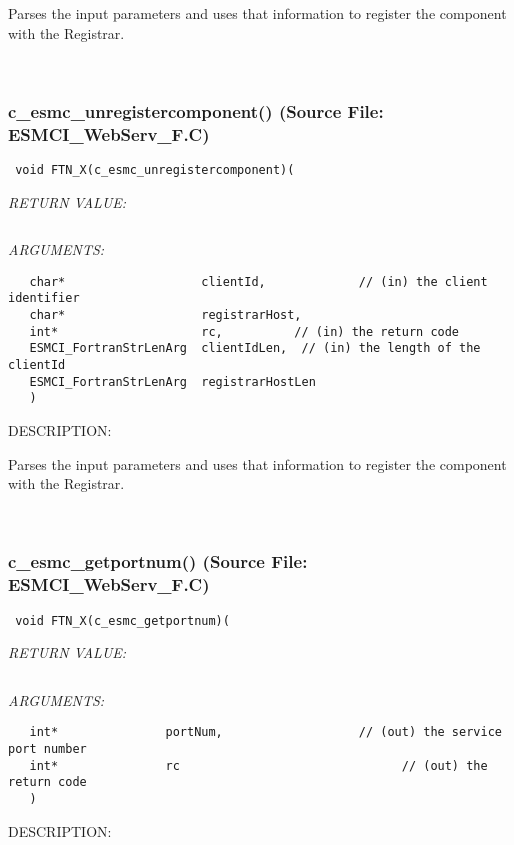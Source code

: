       Parses the input parameters and uses that information to register the
      component with the Registrar.
   
 
\mbox{}\hrulefill\
 
\subsubsection{c\_esmc\_unregistercomponent() (Source File: ESMCI\_WebServ\_F.C)}


  
\begin{verbatim} void FTN_X(c_esmc_unregistercomponent)(\end{verbatim}{\em RETURN VALUE:}
\begin{verbatim} \end{verbatim}{\em ARGUMENTS:}
\begin{verbatim}   char*                   clientId,             // (in) the client identifier
   char*                   registrarHost,
   int*                    rc,          // (in) the return code
   ESMCI_FortranStrLenArg  clientIdLen,  // (in) the length of the clientId
   ESMCI_FortranStrLenArg  registrarHostLen
   )\end{verbatim}
{\sf DESCRIPTION:\\ }


      Parses the input parameters and uses that information to register the
      component with the Registrar.
   
 
\mbox{}\hrulefill\
 
\subsubsection{c\_esmc\_getportnum() (Source File: ESMCI\_WebServ\_F.C)}


  
\begin{verbatim} void FTN_X(c_esmc_getportnum)(\end{verbatim}{\em RETURN VALUE:}
\begin{verbatim} \end{verbatim}{\em ARGUMENTS:}
\begin{verbatim}   int*               portNum,                   // (out) the service port number
   int*               rc                               // (out) the return code
   )\end{verbatim}
{\sf DESCRIPTION:\\ }


